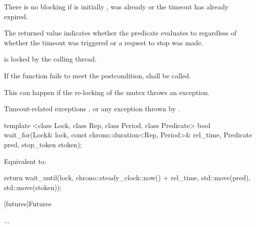 {\begin{itemdescr}
\pnum
\begin{note} There is no blocking if
              is initially , 
              was already  or
             the timeout has already expired. \end{note}

\pnum
\begin{note} The returned value indicates whether the predicate evaluates to 
regardless of whether the timeout was triggered or a request to stop was made. \end{note}

 \pnum \postconditions {} is locked by the calling thread.

 \pnum \remarks
        If the function fails to meet the postcondition, 
        shall be called.
        \begin{note} This can happen if the re-locking of the mutex throws an exception. \end{note}

 \pnum \throws 
        Timeout-related exceptions ,
        or any exception thrown by .

\end{itemdescr}



\begin{itemdecl}
template <class Lock, class Rep, class Period, class Predicate>
  bool wait_for(Lock& lock,
                const chrono::duration<Rep, Period>& rel_time,
                Predicate pred,
                stop_token stoken);
\end{itemdecl}
\begin{itemdescr}
 \pnum \effects Equivalent to:
\begin{codeblock}
return wait_until(lock, chrono::steady_clock::now() + rel_time, std::move(pred), std::move(stoken));
\end{codeblock}
\end{itemdescr}

}%


\vspace{5ex}

[futures]{Futures}

...

